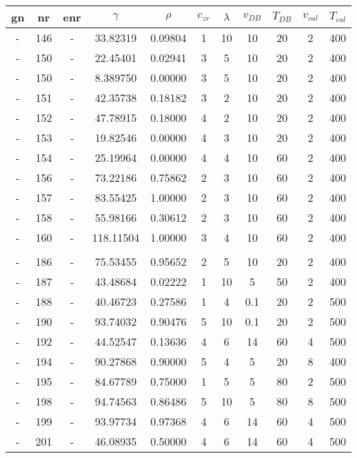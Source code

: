 \begin{table}[h]
	\centering
	\label{tab:pre-emma}
	\begin{tabular}{ccccccccccc}
        \hline\hline
		gn  &nr	    &enr	&$\gamma$	&$\rho$	&$c_{zr}$	    &$\lambda$	&$v_{DB}$	&$T_{DB}$	&$v_{cal}$	&$T_{cal}$\\
        \hline
-	&146	&-	 &33.82319	&0.09804	&1	&10	&10	&20	&2	&400\\
-	&150	&-	 &22.45401	&0.02941	&3	&5	&10	&20	&2	&400\\
-	&150	&-	 &8.389750	&0.00000	&3	&5	&10	&20	&2	&400\\
-	&151	&-	 &42.35738	&0.18182	&3	&2	&10	&20	&2	&400\\
-	&152	&-	 &47.78915	&0.18000	&4	&2	&10	&20	&2	&400\\
-	&153	&-	 &19.82546	&0.00000	&4	&3	&10	&20	&2	&400\\
-	&154	&-	 &25.19964	&0.00000	&4	&4	&10	&60	&2	&400\\
-	&156	&-	 &73.22186	&0.75862	&2	&3	&10	&60	&2	&400\\
-	&157	&-	 &83.55425	&1.00000	&2	&3	&10	&60	&2	&400\\
-	&158	&-	 &55.98166	&0.30612	&2	&3	&10	&60	&2	&400\\
-	&160	&-	 &118.11504	&1.00000	&3	&4	&10	&60	&2	&400\\
   			   	&&&&&&&&&&\\
-	&186	&-	 &75.53455	&0.95652	&2	&5	&10	&20	&2	&400\\
-	&187	&-	 &43.48684	&0.02222	&1	&10	&5	&50	&2	&400\\
-	&188	&-	 &40.46723	&0.27586	&1	&4	&0.1	&20	&2	&500\\
-	&190	&-	 &93.74032	&0.90476	&5	&10	&0.1	&20	&2	&500\\
-	&192	&-	 &44.52547	&0.13636	&4	&6	&14	&60	&4	&500\\
-	&194	&-	 &90.27868	&0.90000	&5	&4	&5	&20	&8	&400\\
-	&195	&-	 &84.67789	&0.75000	&1	&5	&5	&80	&2	&500\\
-	&198	&-	 &94.74563	&0.86486	&5	&10	&5	&80	&8	&500\\
-	&199	&-	 &93.97734	&0.97368	&4	&6	&14	&60	&4	&500\\
-	&201	&-	 &46.08935	&0.50000	&4	&6	&14	&60	&4	&500\\
    \hline\hline
	\end{tabular}
\end{table}


